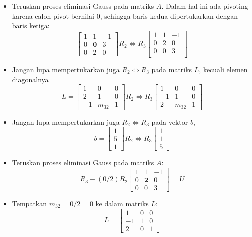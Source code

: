 \documentclass[pdflatex,compress,mathserif]{beamer}
\begin{document}
\begin{frame}
	\begin{itemize}
		\item Teruskan proses eliminasi Gauss pada matriks $ A $. Dalam hal ini ada pivoting karena calon pivot bernilai $ 0 $, sehingga baris kedua dipertukarkan dengan baris ketiga:
		\[ \begin{bmatrix}
			1 & 1 & -1 \\
			0 & \textbf{0} & 3 \\
			0 & 2 & 0
		\end{bmatrix} R_2 \Leftrightarrow R_3
		\begin{bmatrix}
			1 & 1 & -1 \\
			0 & 2 & 0 \\
			0 & 0 & 3 \\
		\end{bmatrix}\]
		\item Jangan lupa mempertukarkan juga $ R_2 \Leftrightarrow R_3 $ pada matriks $ L $, kecuali elemen diagonalnya
		\[
		L = \begin{bmatrix}
			1 & 0 & 0 \\
			2 & 1 & 0 \\
			-1 & m_{32} & 1
		\end{bmatrix}
		R_2 \Leftrightarrow R_3
		\begin{bmatrix}
			1 & 0 & 0 \\
			-1 & 1 & 0 \\
			2 & m_{32} & 1
		\end{bmatrix}
		\]
	\end{itemize}
\end{frame}

\begin{frame}
	\begin{itemize}
		\item Jangan lupa mempertukarkan juga $ R_2 \Leftrightarrow R_3 $ pada vektor $ b $,
		\[ b = \begin{bmatrix}
		1 \\ 5 \\ 1
		\end{bmatrix} R_2 \Leftrightarrow R_3
		 \begin{bmatrix}
		1 \\ 1 \\ 5
		\end{bmatrix}
		\]
		\item Teruskan proses eliminasi Gauss pada matriks $ A $:
		\[ R_3 - (0/2)R_2 \begin{bmatrix}
			1 & 1 & -1 \\
			0 & \textbf{2} & 0 \\
			0 & 0 & 3
		\end{bmatrix} = U \]
		\item Tempatkan $ m_{32} = 0/2 = 0 $ ke dalam matriks $ L $:
		\[ L = \begin{bmatrix}
			1 & 0 & 0 \\
			-1 & 1 & 0 \\
			2 & 0 & 1
		\end{bmatrix}\]
	\end{itemize}
\end{frame}
\end{document}
